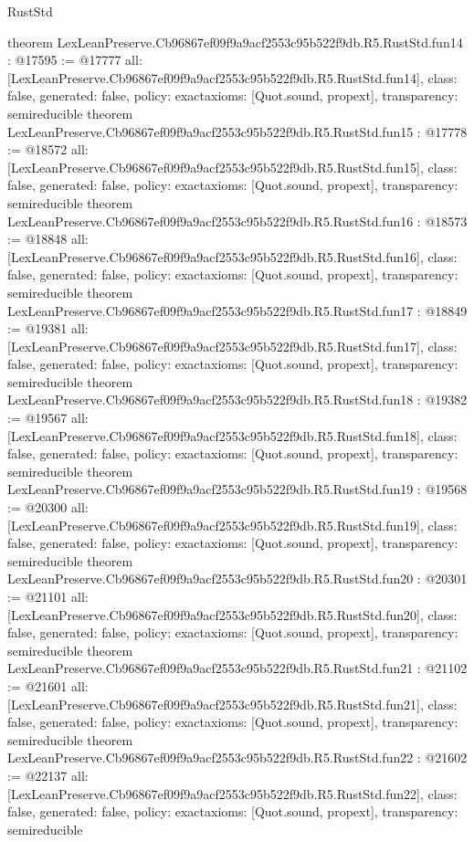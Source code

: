 \begin{lexlean}{RustStd}
\begin{coremodule}
{}
theorem LexLeanPreserve.Cb96867ef09f9a9acf2553c95b522f9db.R5.RustStd.fun14 : @17595 := @17777 {
  all: [LexLeanPreserve.Cb96867ef09f9a9acf2553c95b522f9db.R5.RustStd.fun14],
  class: false,
  generated: false,
  policy: exact{axioms: [Quot.sound, propext]},
  transparency: semireducible
}
theorem LexLeanPreserve.Cb96867ef09f9a9acf2553c95b522f9db.R5.RustStd.fun15 : @17778 := @18572 {
  all: [LexLeanPreserve.Cb96867ef09f9a9acf2553c95b522f9db.R5.RustStd.fun15],
  class: false,
  generated: false,
  policy: exact{axioms: [Quot.sound, propext]},
  transparency: semireducible
}
theorem LexLeanPreserve.Cb96867ef09f9a9acf2553c95b522f9db.R5.RustStd.fun16 : @18573 := @18848 {
  all: [LexLeanPreserve.Cb96867ef09f9a9acf2553c95b522f9db.R5.RustStd.fun16],
  class: false,
  generated: false,
  policy: exact{axioms: [Quot.sound, propext]},
  transparency: semireducible
}
theorem LexLeanPreserve.Cb96867ef09f9a9acf2553c95b522f9db.R5.RustStd.fun17 : @18849 := @19381 {
  all: [LexLeanPreserve.Cb96867ef09f9a9acf2553c95b522f9db.R5.RustStd.fun17],
  class: false,
  generated: false,
  policy: exact{axioms: [Quot.sound, propext]},
  transparency: semireducible
}
theorem LexLeanPreserve.Cb96867ef09f9a9acf2553c95b522f9db.R5.RustStd.fun18 : @19382 := @19567 {
  all: [LexLeanPreserve.Cb96867ef09f9a9acf2553c95b522f9db.R5.RustStd.fun18],
  class: false,
  generated: false,
  policy: exact{axioms: [Quot.sound, propext]},
  transparency: semireducible
}
theorem LexLeanPreserve.Cb96867ef09f9a9acf2553c95b522f9db.R5.RustStd.fun19 : @19568 := @20300 {
  all: [LexLeanPreserve.Cb96867ef09f9a9acf2553c95b522f9db.R5.RustStd.fun19],
  class: false,
  generated: false,
  policy: exact{axioms: [Quot.sound, propext]},
  transparency: semireducible
}
theorem LexLeanPreserve.Cb96867ef09f9a9acf2553c95b522f9db.R5.RustStd.fun20 : @20301 := @21101 {
  all: [LexLeanPreserve.Cb96867ef09f9a9acf2553c95b522f9db.R5.RustStd.fun20],
  class: false,
  generated: false,
  policy: exact{axioms: [Quot.sound, propext]},
  transparency: semireducible
}
theorem LexLeanPreserve.Cb96867ef09f9a9acf2553c95b522f9db.R5.RustStd.fun21 : @21102 := @21601 {
  all: [LexLeanPreserve.Cb96867ef09f9a9acf2553c95b522f9db.R5.RustStd.fun21],
  class: false,
  generated: false,
  policy: exact{axioms: [Quot.sound, propext]},
  transparency: semireducible
}
theorem LexLeanPreserve.Cb96867ef09f9a9acf2553c95b522f9db.R5.RustStd.fun22 : @21602 := @22137 {
  all: [LexLeanPreserve.Cb96867ef09f9a9acf2553c95b522f9db.R5.RustStd.fun22],
  class: false,
  generated: false,
  policy: exact{axioms: [Quot.sound, propext]},
  transparency: semireducible
}
\end{coremodule}
\end{lexlean}
